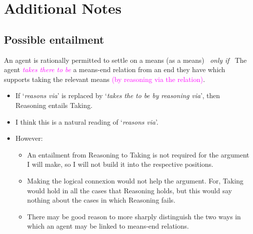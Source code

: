\documentclass[10pt]{article}
\newenvironment{beamerblock}[1]{%
  \tcolorbox[standard,%
  no shadow,
  noparskip,
  colback=white,
  colframe=black,
  colbacktitle=white,
  coltitle=black,
  colupper=black,
  size=small,
  boxrule=.125mm,
  fonttitle=\bfseries,
  sharp corners=all,
  title=#1]}%
{\endtcolorbox}
\newcommand{\schemaName}[1]{\textsf{#1}}
\begin{document}



\newpage

\section{Additional Notes}
\label{sec:additional-notes}


\subsection{Possible entailment}
\label{sec:possible-entailment}

\begin{beamerblock}{\schemaName{Taking (by reasoning via)}}
    An agent is rationally permitted to settle on a means (as a means)
    \newline
    \mbox{ }\hfill\emph{only if}\hfill\mbox{ }
    \newline
    The agent \textcolor{fuchsia}{\emph{takes there to be}} a means-end relation from an end they have which supports taking the relevant means \textcolor{fuchsia}{(by reasoning via the relation)}.
  \end{beamerblock}

\begin{itemize}
\item If `\emph{reasons via}' is replaced by `\emph{takes the to be by reasoning via}', then \schemaName{Reasoning} entails \schemaName{Taking}.
\item I think this is a natural reading of `\emph{reasons via}'.
\item However:
  \begin{itemize}
  \item An entailment from \schemaName{Reasoning} to \schemaName{Taking} is not required for the argument I will make, so I will not build it into the respective positions.
  \item Making the logical connexion would not help the argument. For, \schemaName{Taking} would hold in all the cases that \schemaName{Reasoning} holds, but this would say nothing about the cases in which \schemaName{Reasoning} fails.
  \item There may be good reason to more sharply distinguish the two ways in which an agent may be linked to means-end relations.
  \end{itemize}
\end{itemize}
\end{document}

